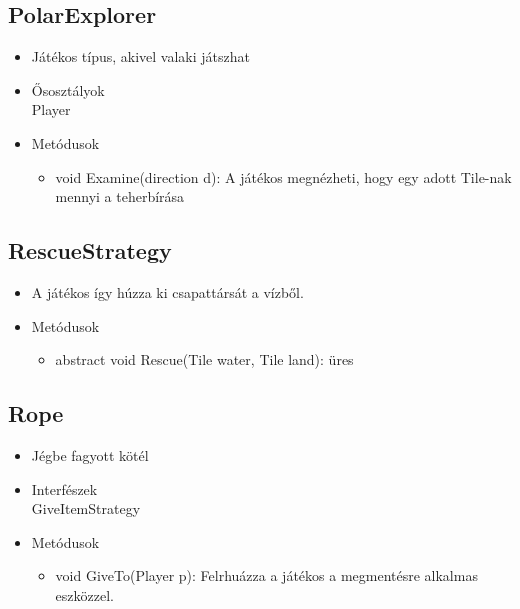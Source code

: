 \subsection{PolarExplorer}
\begin{itemize}
	\item Játékos típus, akivel valaki játszhat\\
	
	\item Ősosztályok\\
	Player
\item Metódusok
\begin{itemize}
	\item void Examine(direction d): A játékos megnézheti, hogy egy adott Tile-nak mennyi a teherbírása
\end{itemize}
\end{itemize}

\subsection{RescueStrategy}
\begin{itemize}
	\item A játékos így húzza ki csapattársát a vízből.\\

\item Metódusok
\begin{itemize}
	\item abstract void Rescue(Tile water, Tile land): üres
\end{itemize}
\end{itemize}

\subsection{Rope}
\begin{itemize}
	\item Jégbe fagyott kötél\\
\item Interfészek\\
GiveItemStrategy
\item Metódusok
\begin{itemize}
	\item void GiveTo(Player p): Felrhuázza a játékos a megmentésre alkalmas eszközzel.
\end{itemize}
\end{itemize}

